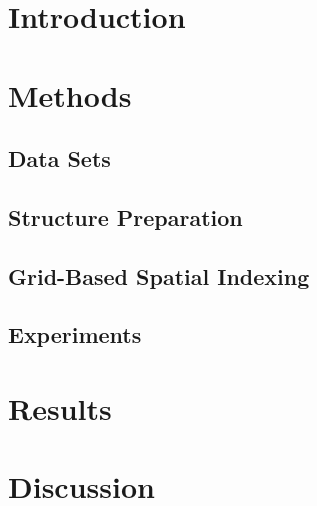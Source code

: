 \maketitle
\doublespacing
\begin{abstract}

\end{abstract}

\section*{Introduction}
\label{sec:intro}


\section*{Methods}
\label{sec:cell/methods}
    \subsection*{Data Sets}
    \label{subsec:data_sets}
    

    \subsection*{Structure Preparation}
    \label{subsec:structure_preparation}
    

    \subsection*{Grid-Based Spatial Indexing}
    \label{subsec:grid_based_indexing}
    

    \subsection*{Experiments}
    \label{subsec:experiments}
    

\section*{Results}
\label{sec:results}


\section*{Discussion}
\label{sec:discussion}







